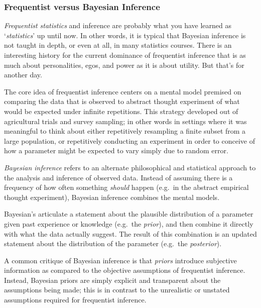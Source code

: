 \documentclass[
]{book}
\begin{document}
\hypertarget{frequentist-versus-bayesian-inference}{%
\subsubsection{Frequentist versus Bayesian Inference}\label{frequentist-versus-bayesian-inference}}

\emph{Frequentist statistics} and inference are probably what you have learned as `\emph{statistics}' up until now. In other words, it is typical that Bayesian inference is not taught in depth, or even at all, in many statistics courses. There is an interesting history for the current dominance of frequentist inference that is as much about personalities, egos, and power as it is about utility. But that's for another day.

The core idea of frequentist inference centers on a mental model premised on comparing the data that is observed to abstract thought experiment of what would be expected under infinite repetitions. This strategy developed out of agricultural trials and survey sampling; in other words in settings where it was meaningful to think about either repetitively resampling a finite subset from a large population, or repetitively conducting an experiment in order to conceive of how a parameter might be expected to vary simply due to random error.

\emph{Bayesian inference} refers to an alternate philosophical and statistical approach to the analysis and inference of observed data. Instead of assuming there is a frequency of how often something \emph{should} happen (e.g.~in the abstract empirical thought experiment), Bayesian inference combines the mental models.

Bayesian's articulate a statement about the plausible distribution of a parameter given past experience or knowledge (e.g.~the \emph{prior}), and then combine it directly with what the data actually suggest. The result of this combination is an updated statement about the distribution of the parameter (e.g.~the \emph{posterior}).

A common critique of Bayesian inference is that \emph{priors} introduce subjective information as compared to the objective assumptions of frequentist inference. Instead, Bayesian priors are simply explicit and transparent about the assumptions being made; this is in contrast to the unrealistic or unstated assumptions required for frequentist inference.
\end{document}
